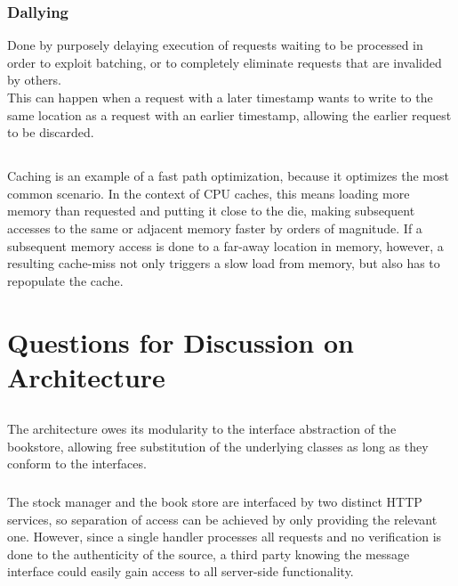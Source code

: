 \documentclass[12pt]{article}
\begin{document}
\subsubsection*{Dallying}
Done by purposely delaying execution of requests waiting to be processed in order to exploit batching, or to completely eliminate requests that are invalided by others. \\
This can happen when a request with a later timestamp wants to write to the same location as a request with an earlier timestamp, allowing the earlier request to be discarded.

\subsection{} %

Caching is an example of a fast path optimization, because it optimizes the most common scenario. In the context of CPU caches, this means loading more memory than requested and putting it close to the die, making subsequent accesses to the same or adjacent memory faster by orders of magnitude. If a subsequent memory access is done to a far-away location in memory, however, a resulting cache-miss not only triggers a slow load from memory, but also has to repopulate the cache.

\section{Questions for Discussion on Architecture} %

\subsection{} %

\subsubsection{} %

The architecture owes its modularity to the interface abstraction of the bookstore, allowing free substitution of the underlying classes as long as they conform to the interfaces.

\subsubsection{} %

The stock manager and the book store are interfaced by two distinct HTTP services, so separation of access can be achieved by only providing the relevant one. However, since a single handler processes all requests and no verification is done to the authenticity of the source, a third party knowing the message interface could easily gain access to all server-side functionality.
\end{document}

